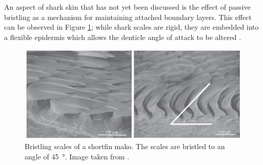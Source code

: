 \documentclass[12pt,oneside,a4paper]{article}
\begin{document}
An aspect of shark skin that has not yet been discussed is the effect of passive bristling as a mechanism for maintaining attached boundary layers. This effect can be observed in Figure \ref{figure:litReview:bristlingScales}; while shark scales are rigid, they are embedded into a flexible epidermis which allows the denticle angle of attack to be altered \citep{lang2014}.
%
\begin{figure}[!b]
\centering
\includegraphics[width=0.8\linewidth]{images/litReview/bristlingScales.png}
\caption{Bristling scales of a shortfin mako. The scales are bristled to an angle of \SI{45}{\degree}. Image taken from \cite{lang2014}.}
\label{figure:litReview:bristlingScales}
\end{figure}
%
\end{document}
